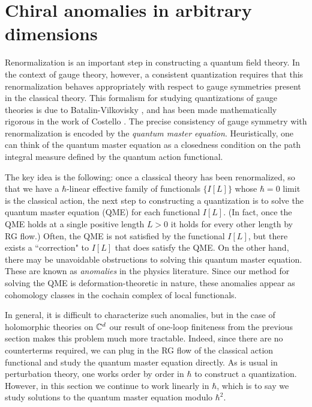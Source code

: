 \documentclass[10pt]{amsart}
\begin{document}
\section{Chiral anomalies in arbitrary dimensions}

Renormalization is an important step in constructing a quantum field theory.
In the context of gauge theory, however, a consistent quantization requires that this renormalization behaves appropriately with respect to gauge symmetries present in the classical theory. 
This formalism for studying quantizations of gauge theories is due to Batalin-Vilkovisky \cite{BV}, and has been made mathematically rigorous in the work of Costello \cite{CosRenorm}.
The precise consistency of gauge symmetry with renormalization is encoded by the {\em quantum master equation}. 
Heuristically, one can think of the quantum master equation as a closedness condition on the path integral measure defined by the quantum action functional. 

The key idea is the following: once a classical theory has been renormalized, so that we have a $\hbar$-linear effective family of functionals $\{I[L]\}$ whose $\hbar = 0$ limit is the classical action, the next step to constructing a quantization is to solve the quantum master equation (QME) for each functional $I[L]$. 
(In fact, once the QME holds at a single positive length $L>0$ it holds for every other length by RG flow.)
Often, the QME is not satisfied by the functional $I[L]$, but there exists a ``correction" to $I[L]$ that does satisfy the QME. 
On the other hand, there may be unavoidable obstructions to solving this quantum master equation.
These are known as {\em anomalies} in the physics literature. 
Since our method for solving the QME is deformation-theoretic in nature, these anomalies appear as cohomology classes in the cochain complex of local functionals. 

In general, it is difficult to characterize such anomalies, but in the case of holomorphic theories on $\mathbb C^d$ our result of one-loop finiteness from the previous section makes this problem much more tractable. 
Indeed, since there are no counterterms required, we can plug in the RG flow of the classical action functional and study the quantum master equation directly. 
As is usual in perturbation theory, one works order by order in $\hbar$ to construct a quantization.
However, in this section we continue to work linearly in $\hbar$, which is to say we study solutions to the quantum master equation modulo $\hbar^2$. 
\end{document}

